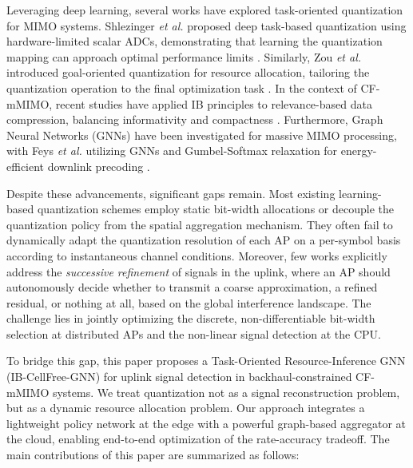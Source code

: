 Leveraging deep learning, several works have explored task-oriented quantization for MIMO systems. Shlezinger \textit{et al.} proposed deep task-based quantization using hardware-limited scalar ADCs, demonstrating that learning the quantization mapping can approach optimal performance limits \cite{Shlezinger2021DeepTask}. Similarly, Zou \textit{et al.} introduced goal-oriented quantization for resource allocation, tailoring the quantization operation to the final optimization task \cite{Zou2022GoalOriented}. In the context of CF-mMIMO, recent studies have applied IB principles to relevance-based data compression, balancing informativity and compactness \cite{Danaee2024RelevanceBased, Danaee2025RelevanceBasedMultiUser}. Furthermore, Graph Neural Networks (GNNs) have been investigated for massive MIMO processing, with Feys \textit{et al.} utilizing GNNs and Gumbel-Softmax relaxation for energy-efficient downlink precoding \cite{Feys2025LearningToQuantize}. 

Despite these advancements, significant gaps remain. Most existing learning-based quantization schemes employ static bit-width allocations or decouple the quantization policy from the spatial aggregation mechanism. They often fail to dynamically adapt the quantization resolution of each AP on a per-symbol basis according to instantaneous channel conditions. Moreover, few works explicitly address the \textit{successive refinement} of signals in the uplink, where an AP should autonomously decide whether to transmit a coarse approximation, a refined residual, or nothing at all, based on the global interference landscape. The challenge lies in jointly optimizing the discrete, non-differentiable bit-width selection at distributed APs and the non-linear signal detection at the CPU.

To bridge this gap, this paper proposes a Task-Oriented Resource-Inference GNN (IB-CellFree-GNN) for uplink signal detection in backhaul-constrained CF-mMIMO systems. We treat quantization not as a signal reconstruction problem, but as a dynamic resource allocation problem. Our approach integrates a lightweight policy network at the edge with a powerful graph-based aggregator at the cloud, enabling end-to-end optimization of the rate-accuracy tradeoff. The main contributions of this paper are summarized as follows:

